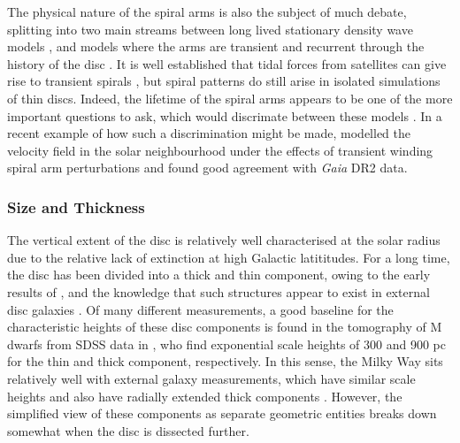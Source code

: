 The physical nature of the spiral arms is also the subject of much debate, splitting into two main streams between long lived stationary density wave models \citep[e.g.][]{1964ApJ...140..646L,1996ssgd.book.....B}, and models where the arms are transient and recurrent through the history of the disc \citep[e.g.][]{1981seng.proc..111T,1984ApJ...282...61S}. It is well established that tidal forces from satellites can give rise to transient spirals \citep[e.g.][]{2010MNRAS.403..625D}, but spiral patterns do still arise in isolated simulations of thin discs. Indeed, the lifetime of the spiral arms appears to be one of the more important questions to ask, which would discrimate between these models \citep{2011MNRAS.410.1637S}. In a recent example of how such a discrimination might be made, \citet{2018MNRAS.481.3794H} modelled the velocity field in the solar neighbourhood under the effects of transient winding spiral arm perturbations and found good agreement with \emph{Gaia} DR2 data. 

\subsubsection{Size and Thickness}
\label{sec:discsize}
The vertical extent of the disc is relatively well characterised at the solar radius due to the relative lack of extinction at high Galactic latititudes. For a long time, the disc has been divided into a thick and thin component, owing to the early results of \citet{1983MNRAS.202.1025G}, and the knowledge that such structures appear to exist in external disc galaxies \citep[e.g.][]{1979ApJ...234..829B,1979ApJ...234..842T,2006AJ....131..226Y}. Of many different measurements, a good baseline for the characteristic heights of these disc components is found in the tomography of M dwarfs from SDSS data in \citet{2008ApJ...673..864J}, who find exponential scale heights of 300 and 900 pc for the thin and thick component, respectively. In this sense, the Milky Way sits relatively well with external galaxy measurements, which have similar scale heights and also have radially extended thick components \citep[e.g][]{2006AJ....131..226Y}. However, the simplified view of these components as separate geometric entities breaks down somewhat when the disc is dissected further.

